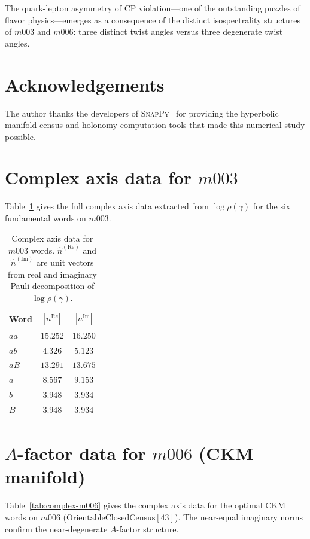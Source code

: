 \documentclass[11pt,a4paper]{article}
\begin{document}
The quark-lepton asymmetry of CP violation---one of the outstanding
puzzles of flavor physics---emerges as a consequence of the distinct
isospectrality structures of $m003$ and $m006$: three distinct twist
angles versus three degenerate twist angles.

\section*{Acknowledgements}
The author thanks the developers of
\textsc{SnapPy}~\cite{Culler2023} for providing the hyperbolic
manifold census and holonomy computation tools that made this
numerical study possible.


\appendix

\section{Complex axis data for $m003$}
\label{app:complexdata}

Table~\ref{tab:complex-m003} gives the full complex axis data
extracted from $\log\rho(\gamma)$ for the six fundamental words on
$m003$.

\begin{table}[ht]
\caption{Complex axis data for $m003$ words.  $\hat{n}^{(\mathrm{Re})}$
  and $\hat{n}^{(\mathrm{Im})}$ are unit vectors from real and
  imaginary Pauli decomposition of $\log\rho(\gamma)$.}
\label{tab:complex-m003}
\centering
\begin{tabular}{lcc}
\toprule
Word & $|n^{\mathrm{Re}}|$ & $|n^{\mathrm{Im}}|$ \\
\midrule
$aa$ & $15.252$ & $16.250$ \\
$ab$ & $4.326$  & $5.123$  \\
$aB$ & $13.291$ & $13.675$ \\
$a$  & $8.567$  & $9.153$  \\
$b$  & $3.948$  & $3.934$  \\
$B$  & $3.948$  & $3.934$  \\
\bottomrule
\end{tabular}
\end{table}

\section{$A$-factor data for $m006$ (CKM manifold)}
\label{app:m006data}

Table~\ref{tab:complex-m006} gives the complex axis data for the
optimal CKM words on $m006$
($\mathrm{OrientableClosedCensus}[43]$).  The near-equal imaginary
norms confirm the near-degenerate $A$-factor structure.
\end{document}

